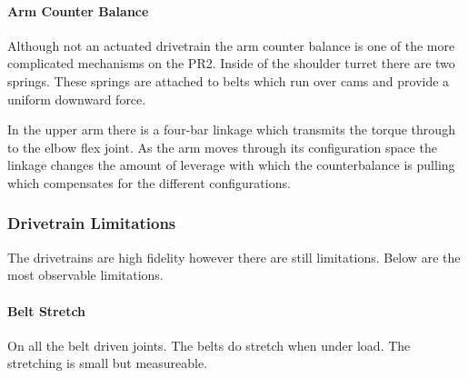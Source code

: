 \paragraph{Arm Counter Balance}
Although not an actuated drivetrain the arm counter balance is one of
the more complicated mechanisms on the PR2. Inside of the shoulder
turret there are two springs.  These springs are attached to belts
which run over cams and provide a uniform downward force.

In the upper arm there is a four-bar linkage which transmits the
torque through to the elbow flex joint.  As the arm moves through its
configuration space the linkage changes the amount of leverage with
which the counterbalance is pulling which compensates for the
different configurations.

\subsubsection{Drivetrain Limitations}
The drivetrains are high fidelity however there are still limitations.
Below are the most observable limitations.


\paragraph{Belt Stretch}
On all the belt driven joints.  The belts do stretch when under load.
The stretching is small but measureable.

